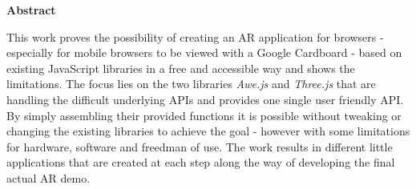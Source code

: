 \thispagestyle{empty}
\vspace{8cm}
\noindent
{\centerline {\bf \large Abstract}}
\vspace{1cm}
\noindent

This work proves the possibility of creating an AR application for browsers - especially for mobile browsers to be viewed with a Google Cardboard - based on existing JavaScript libraries in a free and accessible way and shows the limitations.
The focus lies on the two libraries \textit{Awe.js} and \textit{Three.js} that are handling the difficult underlying APIs and provides one single user friendly API. 
By simply assembling their provided functions it is possible without tweaking or changing the existing libraries to achieve the goal - however with some limitations for hardware, software and freedman of use.
The work results in different little applications that are created at each step along the way of developing the final actual AR demo.